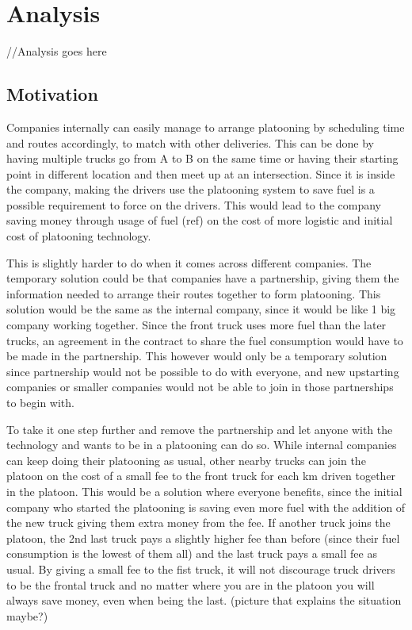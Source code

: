 \section{Analysis}\label{sec:Analysis}

//Analysis goes here\par
% 
\subsection{Motivation}

Companies internally can easily manage to arrange platooning by scheduling time and routes accordingly, to match with other deliveries. This can be done by having multiple trucks go from A to B on the same time or having their starting point in different location and then meet up at an intersection. Since it is inside the company, making the drivers use the platooning system to save fuel is a possible requirement to force on the drivers. This would lead to the company saving money through usage of fuel (ref) on the cost of more logistic and initial cost of platooning technology.\par
% 
This is slightly harder to do when it comes across different companies. The temporary solution could be that companies have a partnership, giving them the information needed to arrange their routes together to form platooning. This solution would be the same as the internal company, since it would be like 1 big company working together. Since the front truck uses more fuel than the later trucks, an agreement in the contract to share the fuel consumption would have to be made in the partnership. This however would only be a temporary solution since partnership would not be possible to do with everyone, and new upstarting companies or smaller companies would not be able to join in those partnerships to begin with.\par
% 
To take it one step further and remove the partnership and let anyone with the technology and wants to be in a platooning can do so. While internal companies can keep doing their platooning as usual, other nearby trucks can join the platoon on the cost of a small fee to the front truck for each km driven together in the platoon. This would be a solution where everyone benefits, since the initial company who started the platooning is saving even more fuel with the addition of the new truck giving them extra money from the fee. If another truck joins the platoon, the 2nd last truck pays a slightly higher fee than before (since their fuel consumption is the lowest of them all) and the last truck pays a small fee as usual. By giving a small fee to the fist truck, it will not discourage truck drivers to be the frontal truck and no matter where you are in the platoon you will always save money, even when being the last.
(picture that explains the situation maybe?)
% 

